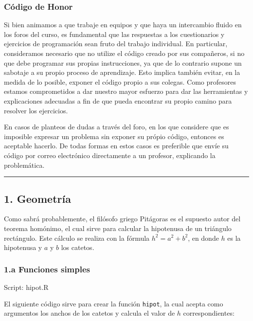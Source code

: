 \documentclass[]{article}
\begin{document}
\subsubsection{Código de Honor}

Si bien animamos a que trabaje en equipos y que haya un intercambio
fluido en los foros del curso, es fundamental que las respuestas a los
cuestionarios y ejercicios de programación sean fruto del trabajo
individual. En particular, consideramos necesario que no utilize el
código creado por sus compañeros, si no que debe programar sus propias
instrucciones, ya que de lo contrario supone un sabotaje a su propio
proceso de aprendizaje. Esto implica también evitar, en la medida de lo
posible, exponer el código propio a sus colegas. Como profesores estamos
comprometidos a dar nuestro mayor esfuerzo para dar las herramientas y
explicaciones adecuadas a fin de que pueda encontrar su propio camino
para resolver los ejercicios.

En casos de planteos de dudas a través del foro, en los que considere
que es imposible expresar un problema sin exponer su própio código,
entonces es aceptable hacerlo. De todas formas en estos casos es
preferible que envíe su código por correo electrónico directamente a un
profesor, explicando la problemática.

\begin{center}\rule{3in}{0.4pt}\end{center}

\subsection{1. Geometría}

Como sabrá probablemente, el filósofo griego Pitágoras es el supuesto
autor del teorema homónimo, el cual sirve para calcular la hipotenusa de
un triángulo rectángulo. Este cálculo se realiza con la fórmula
$h^2 = a^2 + b^2$, en donde $h$ es la hipotenusa y $a$ y $b$ los
catetos.

\subsubsection{1.a Funciones simples}

Script: hipot.R

El siguiente código sirve para crear la función \texttt{hipot}, la cual
acepta como argumentos los anchos de los catetos y calcula el valor de
$h$ correspondientes:
\end{document}
